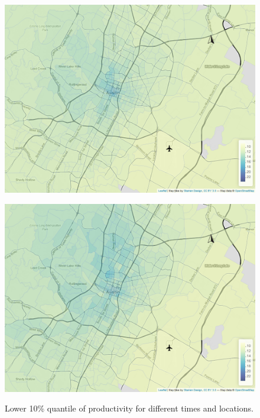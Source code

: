 \documentclass[11pt]{article}
\begin{document}
\begin{figure}[htb]
\begin{minipage}[t]{.48\linewidth}
        \centering
        \includegraphics[width=\linewidth]{img/quantile_142_1.png}
        \label{fig:quantiles:0.1:c}
    \end{minipage}
    \begin{minipage}[t]{0.48\linewidth}
        \centering
        \includegraphics[width=\linewidth]{img/quantile_168_1.png}
        \label{fig:quantiles:0.1:d}
    \end{minipage}
    \caption{Lower 10\% quantile of productivity for different times and locations.}
    \label{fig:quantiles:0.1}
\end{figure}
\end{document}
